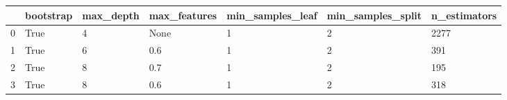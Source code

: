 \begin{tabular}{lllllll}
\toprule
{} & bootstrap & max\_depth & max\_features & min\_samples\_leaf & min\_samples\_split & n\_estimators \\
\midrule
0 &      True &         4 &         None &                1 &                 2 &         2277 \\
1 &      True &         6 &          0.6 &                1 &                 2 &          391 \\
2 &      True &         8 &          0.7 &                1 &                 2 &          195 \\
3 &      True &         8 &          0.6 &                1 &                 2 &          318 \\
\bottomrule
\end{tabular}
